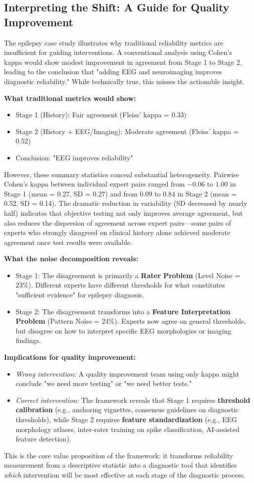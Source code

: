 \subsection*{Interpreting the Shift: A Guide for Quality Improvement}

The epilepsy case study illustrates why traditional reliability metrics are insufficient for guiding interventions. A conventional analysis using Cohen's kappa would show modest improvement in agreement from Stage 1 to Stage 2, leading to the conclusion that "adding EEG and neuroimaging improves diagnostic reliability." While technically true, this misses the actionable insight.

\textbf{What traditional metrics would show:}
\begin{itemize}
    \item Stage 1 (History): Fair agreement (Fleiss' kappa = 0.33)
    \item Stage 2 (History + EEG/Imaging): Moderate agreement (Fleiss' kappa = 0.52)
    \item Conclusion: "EEG improves reliability"
\end{itemize}

However, these summary statistics conceal substantial heterogeneity. Pairwise Cohen's kappa between individual expert pairs ranged from $-0.06$ to $1.00$ in Stage 1 (mean = 0.27, SD = 0.27) and from $0.09$ to $0.84$ in Stage 2 (mean = 0.52, SD = 0.14). The dramatic reduction in variability (SD decreased by nearly half) indicates that objective testing not only improves average agreement, but also reduces the dispersion of agreement across expert pairs---some pairs of experts who strongly disagreed on clinical history alone achieved moderate agreement once test results were available.

\textbf{What the noise decomposition reveals:}
\begin{itemize}
    \item Stage 1: The disagreement is primarily a \textbf{Rater Problem} (Level Noise = 23\%). Different experts have different thresholds for what constitutes "sufficient evidence" for epilepsy diagnosis.
    \item Stage 2: The disagreement transforms into a \textbf{Feature Interpretation Problem} (Pattern Noise = 24\%). Experts now agree on general thresholds, but disagree on how to interpret specific EEG morphologies or imaging findings.
\end{itemize}

\textbf{Implications for quality improvement:}
\begin{itemize}
    \item \textit{Wrong intervention:} A quality improvement team using only kappa might conclude "we need more testing" or "we need better tests."
    \item \textit{Correct intervention:} The framework reveals that Stage 1 requires \textbf{threshold calibration} (e.g., anchoring vignettes, consensus guidelines on diagnostic thresholds), while Stage 2 requires \textbf{feature standardization} (e.g., EEG morphology atlases, inter-rater training on spike classification, AI-assisted feature detection).
\end{itemize}

This is the core value proposition of the framework: it transforms reliability measurement from a descriptive statistic into a diagnostic tool that identifies \textit{which} intervention will be most effective at each stage of the diagnostic process.

